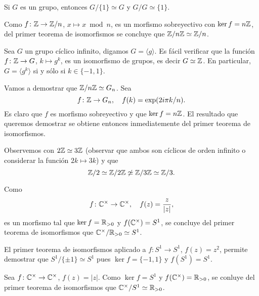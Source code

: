 \begin{examples}
Si $G$ es un grupo, entonces $G/\{1\}\simeq G$ y $G/G\simeq\{1\}$. 
\end{examples}

\begin{example}
Como $f\colon\mathbb{Z}\to\mathbb{Z}/n$, $x\mapsto x\bmod n$, es un morfismo sobreyectivo con $\ker f=n\mathbb{Z}$, del primer teorema de isomorfismos se concluye que 
$\mathbb{Z}/n\mathbb{Z}\simeq\mathbb{Z}/n$. 	
\end{example}

\begin{example}
Sea $G$ un grupo cíclico infinito, digamos $G=\langle g\rangle$. Es fácil verificar que la función $f\colon\mathbb{Z}\to G$, $k\mapsto g^k$, 
es un isomorfismo de grupos, es decir $G\simeq\mathbb{Z}$. En particular, $G=\langle g^k\rangle$ si y sólo si $k\in\{-1,1\}$. 
\end{example}

\begin{example}
Vamos a demostrar que 
$\mathbb{Z}/n\mathbb{Z}\simeq G_n$. Sea 
\[
f\colon\mathbb{Z}\to G_n,\quad
f(k)=\exp(2i\pi k/n).
\]
Es claro que $f$ es morfismo sobreyectivo y que $\ker f=n\mathbb{Z}$. El resultado que queremos demostrar se obtiene entonces inmediatemente del primer teorema de isomorfismos.	
\end{example}

\begin{example}
Observemos con $2\mathbb{Z}\simeq 3\mathbb{Z}$ (observar que ambos son cíclicos de orden infinito o considerar la función $2k\mapsto 3k$) y que 
\[
\mathbb{Z}/2\simeq\mathbb{Z}/2\mathbb{Z}\not\simeq\mathbb{Z}/3\mathbb{Z}\simeq\mathbb{Z}/3.
\]
\end{example}

\begin{example}
Como 
\[
f\colon\mathbb{C}^\times\to\mathbb{C}^\times, 
\quad
f(z)=\frac{z}{|z|},
\]
es un morfismo tal que $\ker f=\mathbb{R}_{>0}$ y $f(\mathbb{C}^\times)=S^1$, se concluye del primer teorema
de isomorfismos que $\mathbb{C}^\times/\mathbb{R}_{>0}\simeq S^1$.  
\end{example}

\begin{example}
El primer teorema de isomorfismos aplicado a $f\colon S^1\to S^1$, $f(z)=z^2$, permite demostrar que $S^1/\{\pm1\}\simeq S^1$ pues
$\ker f=\{-1,1\}$ y $f(S^1)=S^1$. 	
\end{example}

\begin{example}
Sea $f\colon\mathbb{C}^\times\to\mathbb{C}^\times$, $f(z)=|z|$. Como $\ker f=S^1$ y $f(\mathbb{C}^\times)=\mathbb{R}_{>0}$, se conluye del primer teorema
de isomorfismos que $\mathbb{C}^\times/S^1\simeq\mathbb{R}_{>0}$. 
\end{example}

